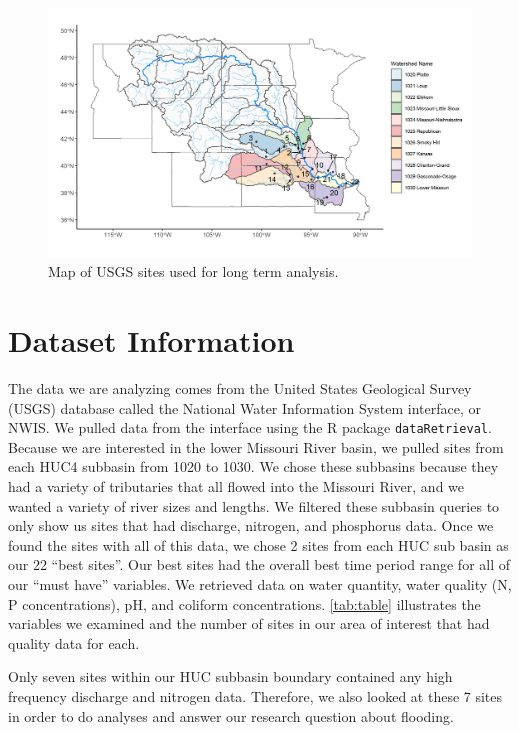 \documentclass[12pt,]{article}
\makeatletter
\def\maxwidth{\ifdim\Gin@nat@width>\linewidth\linewidth\else\Gin@nat@width\fi}
\makeatother
\begin{document}
\begin{figure}
\includegraphics[width=\maxwidth]{../Figures/site_map} \caption{\label{fig:sitemap} Map of USGS sites used for long term analysis.}\label{fig:sitemap}
\end{figure}

\newpage

\hypertarget{dataset-information}{%
\section{Dataset Information}\label{dataset-information}}

The data we are analyzing comes from the United States Geological Survey
(USGS) database called the National Water Information System interface,
or NWIS. We pulled data from the interface using the R package
\texttt{dataRetrieval}. Because we are interested in the lower Missouri
River basin, we pulled sites from each HUC4 subbasin from 1020 to 1030.
We chose these subbasins because they had a variety of tributaries that
all flowed into the Missouri River, and we wanted a variety of river
sizes and lengths. We filtered these subbasin queries to only show us
sites that had discharge, nitrogen, and phosphorus data. Once we found
the sites with all of this data, we chose 2 sites from each HUC sub
basin as our 22 ``best sites''. Our best sites had the overall best time
period range for all of our ``must have'' variables. We retrieved data
on water quantity, water quality (N, P concentrations), pH, and coliform
concentrations. \ref{tab:table} illustrates the variables we examined
and the number of sites in our area of interest that had quality data
for each.

Only seven sites within our HUC subbasin boundary contained any high
frequency discharge and nitrogen data. Therefore, we also looked at
these 7 sites in order to do analyses and answer our research question
about flooding.
\end{document}
